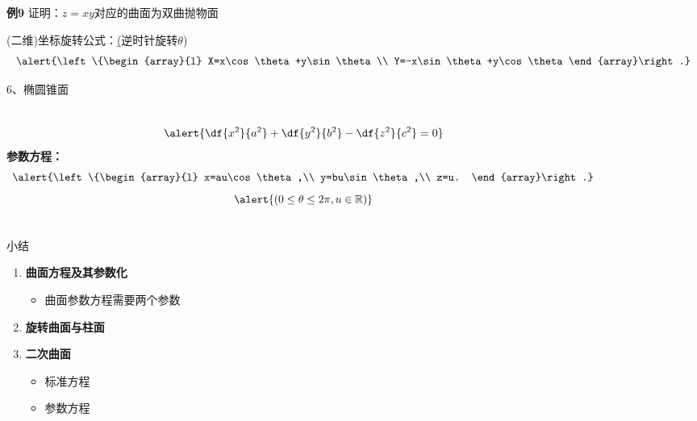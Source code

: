 \begin{frame}
	\linespread{1.2}
	\begin{exampleblock}{{\bf 例9}\hfill}
		证明：$z=xy$对应的曲面为双曲抛物面
	\end{exampleblock}\pause 
	\begin{center}
 	\end{center}\pause 
 	{\bb (二维)坐标旋转公式：}{\b (逆时针旋转$\theta$)}
 	$$\alert{\left\{\begin{array}{l}
 		X=x\cos\theta+y\sin\theta\\
 		Y=-x\sin\theta+y\cos\theta
 	\end{array}\right.}$$
\end{frame}

\begin{frame}{6、椭圆锥面}
	\linespread{1.2}\pause 
	\begin{columns}
			$$\alert{\df{x^2}{a^2}+\df{y^2}{b^2}-\df{z^2}{c^2}=0}$$\pause 
			{\bf 参数方程：}
			$$\alert{\left\{\begin{array}{l}
				x=au\cos\theta,\\
				y=bu\sin\theta,\\
				z=u.
			\end{array}\right.}
			$$
			$$\alert{(0\leq\theta\leq 2\pi,u\in\mathbb{R})}$$
		\pause 
		\begin{center}
	 	\end{center}
	\end{columns}
\end{frame}

\begin{frame}[<+->]{小结}
	\linespread{1.5}
	\begin{enumerate}
	  \item {\bf 曲面方程及其参数化}
	  \begin{itemize}
	    \item 曲面参数方程需要两个参数
	  \end{itemize}
	  \item {\bf 旋转曲面与柱面}
	  \item {\bf 二次曲面}
	  \begin{itemize}
	    \item 标准方程
	    \item 参数方程
	  \end{itemize}
	\end{enumerate}
\end{frame}

